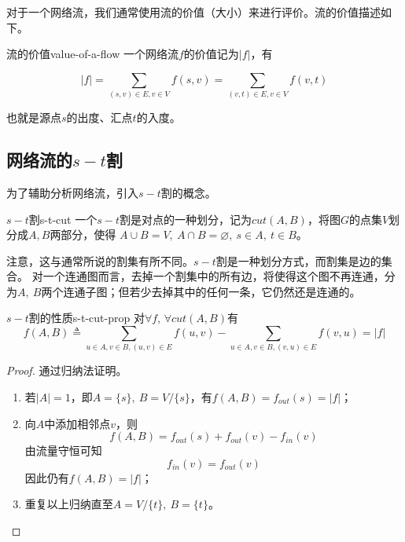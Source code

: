 	\par 对于一个网络流，我们通常使用流的价值（大小）来进行评价。流的价值描述如下。

\begin{definition}{流的价值}{value-of-a-flow}
	一个网络流\(f\)的价值记为\(|f|\)，有
	
	\begin{equation}
	|f| = \sum_{(s,v) \in E, v \in V} f(s,v) = \sum_{(v,t) \in E, v \in V} f(v,t)
	\end{equation}
	
	也就是源点\(s\)的出度、汇点\(t\)的入度。
	
\end{definition}

\subsection{网络流的\(s-t\)割}

	\par 为了辅助分析网络流，引入\(s-t\)割的概念。

\begin{definition}{\(s-t\)割}{s-t-cut}
	一个\(s-t\)割是对点的一种划分，记为\(cut(A, B)\)，将图\(G\)的点集\(V\)划分成\(A, B\)两部分，使得
	\(A \cup B = V,\ A \cap B = \varnothing,\ s \in A,\ t \in B\)。
\end{definition}

	\par 注意，这与通常所说的割集有所不同。\(s-t\)割是一种划分方式，而割集是边的集合。
	对一个连通图而言，去掉一个割集中的所有边，将使得这个图不再连通，分为\(A,\ B\)两个连通子图；但若少去掉其中的任何一条，它仍然还是连通的。

\begin{proposition}{\(s-t\)割的性质}{s-t-cut-prop}
	对\(\forall f\), \(\forall cut(A, B)\)有
	\begin{equation}
		f(A,B) \triangleq \sum_{u \in A, v \in B, (u,v) \in E} f(u,v) - \sum_{u \in A, v \in B, (v,u) \in E} f(v,u) = |f|
	\end{equation}
\end{proposition}

\begin{proof}
	通过归纳法证明。
	\begin{enumerate}[(1)]
	\item 若\(|A| = 1\)，即\(A = \{s\},\ B = V / \{s\}\)，有\(f(A, B) = f_{out}(s) = |f|\)；
	\item 向\(A\)中添加相邻点\(v\)，则
	\begin{equation}\nonumber
		f(A, B) = f_{out}(s) + f_{out}(v) - f_{in}(v)
	\end{equation}
	由流量守恒可知
	\begin{equation}\nonumber
		f_{in}(v) = f_{out}(v)
	\end{equation}
	因此仍有\(f(A, B) = |f|\)；
	\item 重复以上归纳直至\(A = V / \{t\},\ B = \{t\}\)。
	\end{enumerate}
\end{proof}

